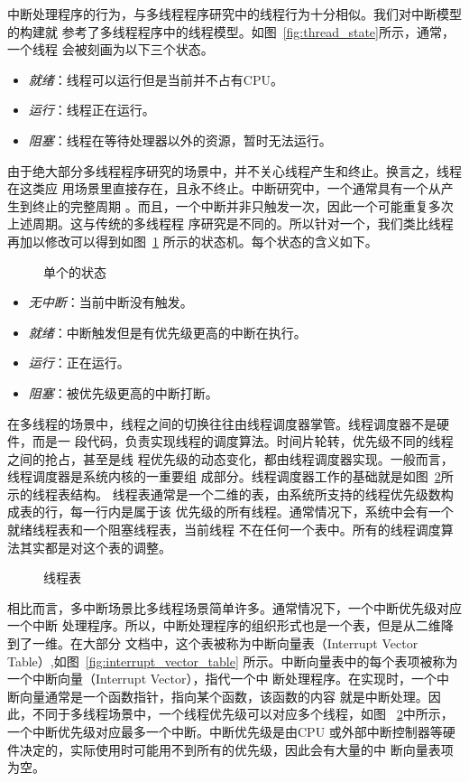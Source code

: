 中断处理程序的行为，与多线程程序研究中的线程行为十分相似。我们对中断模型的构建就
参考了多线程程序中的线程模型。如图~\ref{fig:thread_state}所示，通常，一个线程
会被刻画为以下三个状态。
\begin{itemize}
	\item \emph{就绪}：线程可以运行但是当前并不占有CPU。
	\item \emph{运行}：线程正在运行。
	\item \emph{阻塞}：线程在等待处理器以外的资源，暂时无法运行。
\end{itemize}
由于绝大部分多线程程序研究的场景中，并不关心线程产生和终止。换言之，线程在这类应
用场景里直接存在，且永不终止。中断研究中，一个通常具有一个从产生到终止的完整周期
。而且，一个中断并非只触发一次，因此一个可能重复多次上述周期。这与传统的多线程程
序研究是不同的。所以针对一个，我们类比线程再加以修改可以得到如图~\ref{fig:interrupt_state}
所示的状态机。每个状态的含义如下。

\begin{figure}[H]
	\centering
	
	\caption{单个的状态}
	\label{fig:interrupt_state}
\end{figure}

\begin{itemize}
	\item \emph{无中断}：当前中断没有触发。
	\item \emph{就绪}：中断触发但是有优先级更高的中断在执行。
	\item \emph{运行}：正在运行。
	\item \emph{阻塞}：被优先级更高的中断打断。
\end{itemize}

在多线程的场景中，线程之间的切换往往由线程调度器掌管。线程调度器不是硬件，而是一
段代码，负责实现线程的调度算法。时间片轮转，优先级不同的线程之间的抢占，甚至是线
程优先级的动态变化，都由线程调度器实现。一般而言，线程调度器是系统内核的一重要组
成部分。线程调度器工作的基础就是如图~\ref{fig:thread_table}所示的线程表结构。
线程表通常是一个二维的表，由系统所支持的线程优先级数构成表的行，每一行内是属于该
优先级的所有线程。通常情况下，系统中会有一个就绪线程表和一个阻塞线程表，当前线程
不在任何一个表中。所有的线程调度算法其实都是对这个表的调整。

\begin{figure}
	\centering
	
	\caption{线程表}
	\label{fig:thread_table}
\end{figure}

相比而言，多中断场景比多线程场景简单许多。通常情况下，一个中断优先级对应一个中断
处理程序。所以，中断处理程序的组织形式也是一个表，但是从二维降到了一维。在大部分
文档中，这个表被称为中断向量表（Interrupt Vector Table）,如图~\ref{fig:interrupt_vector_table}
所示。中断向量表中的每个表项被称为一个中断向量（Interrupt Vector），指代一个中
断处理程序。在实现时，一个中断向量通常是一个函数指针，指向某个函数，该函数的内容
就是中断处理。因此，不同于多线程场景中，一个线程优先级可以对应多个线程，如图~
\ref{fig:thread_table}中所示，一个中断优先级对应最多一个中断。中断优先级是由CPU
或外部中断控制器等硬件决定的，实际使用时可能用不到所有的优先级，因此会有大量的中
断向量表项为空。

